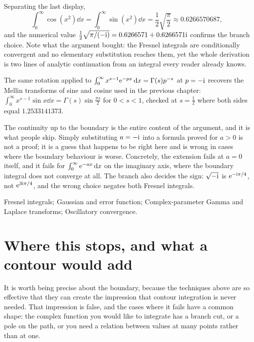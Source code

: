 \begin{worked}
Separating the last display,
\[\int_0^{\infty}\cos(x^{2})\dd x=\int_0^{\infty}\sin(x^{2})\dd x=\frac12\sqrt{\frac{\pi}{2}}\approx0.6266570687,\]
and the numerical value $\tfrac12\sqrt{\pi/(-\mathrm{i})}=0.6266571+0.6266571\mathrm{i}$ confirms the branch choice. Note what the argument bought: the Fresnel integrals are conditionally convergent and no elementary substitution reaches them, yet the whole derivation is two lines of analytic continuation from an integral every reader already knows.

The same rotation applied to $\int_0^{\infty}x^{s-1}\mathrm{e}^{-px}\,\mathrm{d} x=\Gamma(s)p^{-s}$ at $p=-\mathrm{i}$ recovers the Mellin transforms of sine and cosine used in the previous chapter: $\int_0^{\infty}x^{s-1}\sin x\dd x=\Gamma(s)\sin\tfrac{\pi s}{2}$ for $0<s<1$, checked at $s=\tfrac12$ where both sides equal $1.2533141373$.
\end{worked}

\begin{trap}
The continuity up to the boundary is the entire content of the argument, and it is what people skip. Simply substituting $a=-\mathrm{i}$ into a formula proved for $a>0$ is not a proof; it is a guess that happens to be right here and is wrong in cases where the boundary behaviour is worse. Concretely, the extension fails at $a=0$ itself, and it fails for $\int_0^{\infty}\mathrm{e}^{-ax}\,\mathrm{d} x$ on the imaginary axis, where the boundary integral does not converge at all. The branch also decides the sign: $\sqrt{-\mathrm{i}}$ is $\mathrm{e}^{-\mathrm{i}\pi/4}$, not $\mathrm{e}^{3\mathrm{i}\pi/4}$, and the wrong choice negates both Fresnel integrals.
\end{trap}

\begin{seealsob}Fresnel integrals; Gaussian and error function; Complex-parameter Gamma and Laplace transforms; Oscillatory convergence.\end{seealsob}

\section{Where this stops, and what a contour would add}

It is worth being precise about the boundary, because the techniques above are so effective that they can create the impression that contour integration is never needed. That impression is false, and the cases where it fails have a common shape: the complex function you would like to integrate has a branch cut, or a pole on the path, or you need a relation between values at many points rather than at one.

